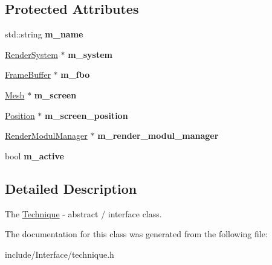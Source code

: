 \subsection*{Protected Attributes}
\begin{DoxyCompactItemize}
\item 
\hypertarget{classEngine_1_1Technique_ac83891d14aa00c0636d53316158c980f}{}std\+::string {\bfseries m\+\_\+name}\label{classEngine_1_1Technique_ac83891d14aa00c0636d53316158c980f}

\item 
\hypertarget{classEngine_1_1Technique_ac712baa8ee14f99aa7a19218f1af87d9}{}\hyperlink{classEngine_1_1RenderSystem}{Render\+System} $\ast$ {\bfseries m\+\_\+system}\label{classEngine_1_1Technique_ac712baa8ee14f99aa7a19218f1af87d9}

\item 
\hypertarget{classEngine_1_1Technique_aeac923581d27aee95fcad3f40e7c5399}{}\hyperlink{classEngine_1_1FrameBuffer}{Frame\+Buffer} $\ast$ {\bfseries m\+\_\+fbo}\label{classEngine_1_1Technique_aeac923581d27aee95fcad3f40e7c5399}

\item 
\hypertarget{classEngine_1_1Technique_a7ca4b5cd6773cb5eed21823faa98d1ff}{}\hyperlink{classEngine_1_1Mesh}{Mesh} $\ast$ {\bfseries m\+\_\+screen}\label{classEngine_1_1Technique_a7ca4b5cd6773cb5eed21823faa98d1ff}

\item 
\hypertarget{classEngine_1_1Technique_a17b435b3a0ff3d78c48a1fbf3b8f85ae}{}\hyperlink{classEngine_1_1Position}{Position} $\ast$ {\bfseries m\+\_\+screen\+\_\+position}\label{classEngine_1_1Technique_a17b435b3a0ff3d78c48a1fbf3b8f85ae}

\item 
\hypertarget{classEngine_1_1Technique_a2dbd2de9b6d39660385d35abca410241}{}\hyperlink{classEngine_1_1RenderModulManager}{Render\+Modul\+Manager} $\ast$ {\bfseries m\+\_\+render\+\_\+modul\+\_\+manager}\label{classEngine_1_1Technique_a2dbd2de9b6d39660385d35abca410241}

\item 
\hypertarget{classEngine_1_1Technique_a64e6cea6714979585f7a3ccd42998f35}{}bool {\bfseries m\+\_\+active}\label{classEngine_1_1Technique_a64e6cea6714979585f7a3ccd42998f35}

\end{DoxyCompactItemize}


\subsection{Detailed Description}
The \hyperlink{classEngine_1_1Technique}{Technique} -\/ abstract / interface class. 

The documentation for this class was generated from the following file\+:\begin{DoxyCompactItemize}
\item 
include/\+Interface/technique.\+h\end{DoxyCompactItemize}
